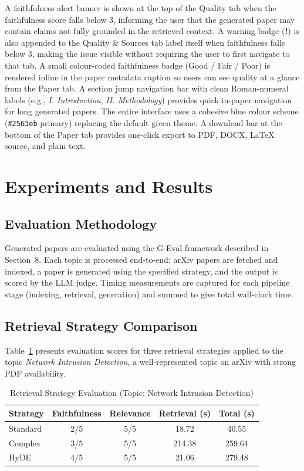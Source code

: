 \documentclass[12pt, a4paper]{article}
\begin{document}
A faithfulness alert banner is shown at the top of the Quality tab when the
faithfulness score falls below 3, informing the user that the generated paper may
contain claims not fully grounded in the retrieved context. A warning badge
(\textbf{!}) is also appended to the Quality \& Sources tab label itself when
faithfulness falls below 3, making the issue visible without requiring the user to
first navigate to that tab. A small colour-coded faithfulness badge (Good / Fair /
Poor) is rendered inline in the paper metadata caption so users can see quality at
a glance from the Paper tab. A section jump navigation bar with clean Roman-numeral
labels (e.g., \textit{I. Introduction}, \textit{II. Methodology}) provides quick
in-paper navigation for long generated papers. The entire interface uses a cohesive
blue colour scheme (\texttt{\#2563eb} primary) replacing the default green theme.
A download bar at the bottom of the Paper tab provides one-click export to PDF,
DOCX, LaTeX source, and plain text.

\section{Experiments and Results}

\subsection{Evaluation Methodology}

Generated papers are evaluated using the G-Eval framework described in Section~8.
Each topic is processed end-to-end: arXiv papers are fetched and indexed, a paper
is generated using the specified strategy, and the output is scored by the LLM
judge. Timing measurements are captured for each pipeline stage (indexing,
retrieval, generation) and summed to give total wall-clock time.

\subsection{Retrieval Strategy Comparison}

Table~\ref{tab:strategies} presents evaluation scores for three retrieval strategies
applied to the topic \textit{Network Intrusion Detection}, a well-represented
topic on arXiv with strong PDF availability.

\begin{table}[h]
  \centering
  \caption{Retrieval Strategy Evaluation (Topic: Network Intrusion Detection)}
  \label{tab:strategies}
  \begin{tabular}{lcccc}
    \toprule
    \textbf{Strategy} & \textbf{Faithfulness} & \textbf{Relevance}
                      & \textbf{Retrieval (s)} & \textbf{Total (s)} \\
    \midrule
    Standard & 2/5 & 5/5 & 18.72 & 40.55  \\
    Complex  & 3/5 & 5/5 & 214.38 & 259.64 \\
    HyDE     & 4/5 & 5/5 & 21.06 & 279.48 \\
    \bottomrule
  \end{tabular}
\end{table}
\end{document}
